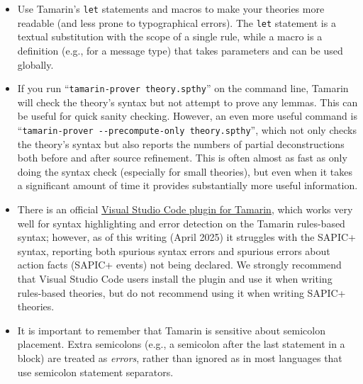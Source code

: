 \begin{itemize}

\item Use Tamarin's \texttt{let} statements and macros to make your theories more readable (and less prone to typographical errors). The \texttt{let} statement is a textual substitution with the scope of a single rule, while a macro is a definition (e.g., for a message type) that takes parameters and can be used globally. 

\item If you run ``\texttt{tamarin-prover theory.spthy}'' on the command line, Tamarin will check the theory's syntax but not attempt to prove any lemmas. This can be useful for quick sanity checking. However, an even more useful command is ``\texttt{tamarin-prover -{}-precompute-only theory.spthy}'', which not only checks the theory's syntax but also reports the numbers of partial deconstructions both before and after source refinement. This is often almost as fast as only doing the syntax check (especially for small theories), but even when it takes a significant amount of time it provides substantially more useful information.

\item There is an official \href{https://marketplace.visualstudio.com/items?itemName=tamarin-prover.tamarin-prover}{Visual Studio Code plugin for Tamarin}, which works very well for syntax highlighting and error detection on the Tamarin rules-based syntax; however, as of this writing (April 2025) it struggles with the SAPIC+ syntax, reporting both spurious syntax errors and spurious errors about action facts (SAPIC+ events) not being declared. We strongly recommend that Visual Studio Code users install the plugin and use it when writing rules-based theories, but do not recommend using it when writing SAPIC+ theories.

\item It is important to remember that Tamarin is sensitive about semicolon placement. Extra semicolons (e.g., a semicolon after the last statement in a block) are treated as \emph{errors}, rather than ignored as in most languages that use semicolon statement separators.

\end{itemize}